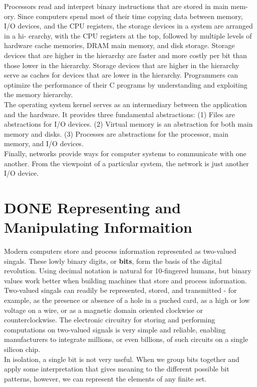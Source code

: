 \documentclass[11pt]{article}
\begin{document}
Processors read and interpret binary instructions that are stored in main mem- ory. Since computers spend most of their time copying data between memory, I/O devices, and the CPU registers, the storage devices in a system are arranged in a hi- erarchy, with the CPU registers at the top, followed by multiple levels of hardware cache memories, DRAM main memory, and disk storage. Storage devices that are higher in the hierarchy are faster and more costly per bit than those lower in the hierarchy. Storage devices that are higher in the hierarchy serve as caches for devices that are lower in the hierarchy. Programmers can optimize the performance of their C programs by understanding and exploiting the memory hierarchy.\\

The operating system kernel serves as an intermediary between the application and the hardware. It provides three fundamental abstractions: (1) Files are abstractions for I/O devices. (2) Virtual memory is an abstraction for both main memory and disks. (3) Processes are abstractions for the processor, main memory, and I/O devices.\\

Finally, networks provide ways for computer systems to communicate with one another. From the viewpoint of a particular system, the network is just another I/O device.\\

\section{{\bfseries\sffamily DONE} Representing and Manipulating Informaition}
\label{sec:org7249b16}
Modern computers store and process information represented as two-valued singals. These lowly binary digits, or \textbf{bits}, form the basis of the digital revolution. Using decimal notation is natural for 10-fingered humans, but binary values work better when building machines that store and process information. Two-valued singals can readily be represented, stored, and transmitted - for example, as the presence or absence of a hole in a puched card, as a high or low voltage on a wire, or as a magnetic domain oriented clockwise or counterclockwise. The electronic circuitry for storing and performing computations on two-valued signals is very simple and reliable, enabling manufacturers to integrate millions, or even billions, of such circuits on a single silicon chip.\\

In isolation, a single bit is not very useful. When we group bits together and apply some interpretation that gives meaning to the different possible bit patterns, however, we can represent the elements of any finite set.\\
\end{document}
